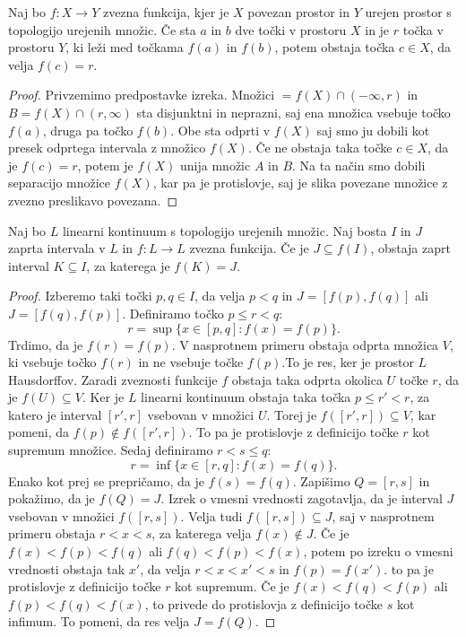 \documentclass[../TG_magistrsko_delo_sections.tex]{subfiles}
\begin{document}
\begin{izrek}
Naj bo $f : X \to Y$ zvezna funkcija, kjer je $X$ povezan prostor in $Y$ urejen prostor s topologijo urejenih množic. Če sta $a$ in $b$ dve točki v prostoru $X$ in je $r$ točka v prostoru $Y$, ki leži med točkama $f(a)$ in $f(b)$, potem obstaja točka $c \in X$, da velja $f(c) = r$.
\end{izrek}
\begin{proof}
Privzemimo predpostavke izreka. Množici $=f(X) \cap (-\infty, r)$ in $B=f(X) \cap (r, \infty)$ sta disjunktni in neprazni, saj ena množica vsebuje točko $f(a)$, druga pa točko $f(b)$. Obe sta odprti v $f(X)$ saj smo ju dobili kot presek odprtega intervala z množico $f(X)$. Če ne obstaja taka točke $c \in X$, da je $f(c) = r$, potem je $f(X)$ unija množic $A$ in $B$. Na ta način smo dobili separacijo množice $f(X)$, kar pa je protislovje, saj je slika povezane množice z zvezno preslikavo povezana.
\end{proof}

\begin{lema}\label{lem:K}
Naj bo $L$ linearni kontinuum s topologijo urejenih množic. Naj bosta $I$ in $J$ zaprta intervala v $L$ in $f:L \to L$ zvezna funkcija. Če je $J \subseteq f(I)$, obstaja zaprt interval $K \subseteq I$, za katerega je $f(K) = J$.
\end{lema}
\begin{proof}
Izberemo taki točki $p, q \in I$, da velja $p<q$ in $J=[f(p), f(q)]$ ali $J=[f(q), f(p)]$. Definiramo točko $p \leq r < q$:
$$r= \sup\{x \in [p, q] : f(x) = f(p)\}.$$
Trdimo, da je $f(r) = f(p)$. V nasprotnem primeru obstaja odprta množica $V$, ki vsebuje točko $f(r)$ in ne vsebuje točke $f(p)$.To je res, ker je prostor $L$ Hausdorffov. Zaradi zveznosti funkcije $f$ obstaja taka odprta okolica $U$ točke $r$, da je $f(U) \subseteq V$. Ker je $L$ linearni kontinuum obstaja taka točka $p \leq r' < r$, za katero je interval $[r', r]$ vsebovan v množici $U$. Torej je $f([r', r]) \subseteq V$, kar pomeni, da $f(p) \notin f([r', r])$. To pa je protislovje z definicijo točke $r$ kot supremum množice.
Sedaj definiramo $r<s \leq q$:
$$r= \inf\{x \in [r, q] : f(x) = f(q)\}.$$ 
Enako kot prej se prepričamo, da je $f(s) = f(q)$. Zapišimo $Q = [r, s]$ in pokažimo, da je $f(Q) = J$. Izrek o vmesni vrednosti zagotavlja, da je interval $J$ vsebovan v množici $f([r, s])$. Velja tudi $f([r, s]) \subseteq J$, saj v nasprotnem primeru obstaja $r<x<s$, za katerega velja $f(x) \notin J$. Če je $f(x) < f(p) < f(q)$ ali $f(q) < f(p) < f(x)$, potem po izreku o vmesni vrednosti obstaja tak $x'$, da velja $r<x<x'<s$ in $f(p) = f(x')$. to pa je protislovje z definicijo točke $r$ kot supremum. Če je $f(x) < f(q) < f(p)$ ali $f(p) < f(q) < f(x)$, to privede do protislovja z definicijo točke $s$ kot infimum. To pomeni, da res velja $J = f(Q)$.
\end{proof}
\end{document}
